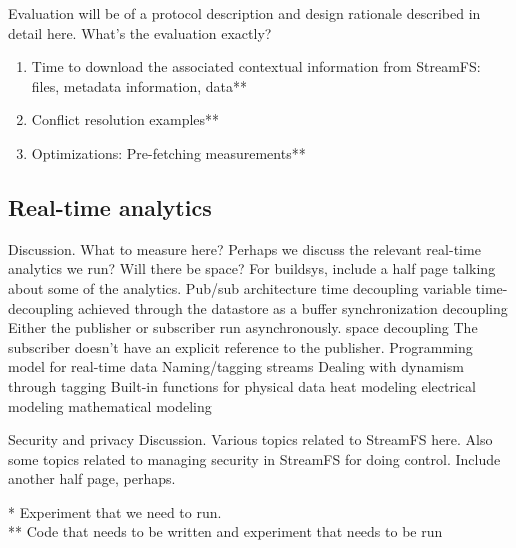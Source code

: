 Evaluation will be of a protocol description and design rationale described in detail here.
What’s the evaluation exactly?

\begin{enumerate}
\item Time to download the associated contextual information from StreamFS: files, metadata information, data**
\item Conflict resolution examples**
\item Optimizations: Pre-fetching measurements**
\end{enumerate}

\subsection{Real-time analytics}
Discussion.  What to measure here?  Perhaps we discuss the relevant real-time analytics we run?  Will there be space?  For buildsys, include a half page talking about some of the analytics.
Pub/sub architecture
time decoupling
variable time-decoupling achieved through the datastore as a buffer
synchronization decoupling
Either the publisher or subscriber run asynchronously.
space decoupling
The subscriber doesn’t have an explicit reference to the publisher.
Programming model for real-time data
Naming/tagging streams
Dealing with dynamism through tagging
Built-in functions for physical data
heat modeling
electrical modeling
mathematical modeling

Security and privacy
Discussion.  Various topics related to StreamFS here.  Also some topics related to managing security in StreamFS for doing control.  Include another half page, perhaps.


* Experiment that we need to run.\\
** Code that needs to be written and experiment that needs to be run